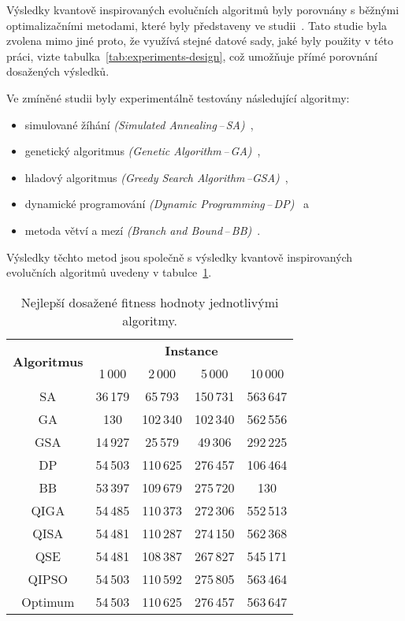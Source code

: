 Výsledky kvantově inspirovaných evolučních algoritmů byly porovnány s běžnými optimalizačními metodami, které byly představeny ve studii~\cite{compare}.  
Tato studie byla zvolena mimo jiné proto, že využívá stejné datové sady, jaké byly použity v této práci, vizte tabulka~\ref{tab:experiments-design}, což umožňuje přímé porovnání dosažených výsledků.

Ve zmíněné studii byly experimentálně testovány následující algoritmy:
\begin{itemize}
    \item simulované žíhání \emph{(Simulated Annealing\,--\,SA)}~\cite{sa},
    \item genetický algoritmus \emph{(Genetic Algorithm\,--\,GA)}~\cite{ga-app},
    \item hladový algoritmus \emph{(Greedy Search Algorithm\,--GSA)}~\cite{GSA},
    \item dynamické programování \emph{(Dynamic Programming\,--\,DP)}~\cite{DP} a 
    \item metoda větví a mezí \emph{(Branch and Bound\,--\,BB)}~\cite{BB}.
\end{itemize}
Výsledky těchto metod jsou společně s výsledky kvantově inspirovaných evolučních algoritmů uvedeny v tabulce~\ref{tab:alg-comparison}.

\begin{table}[ht]
    \centering
    \begin{tabular}{c c c c c}
        \toprule
        \multirow{2}{*}{\textbf{Algoritmus}} &
        \multicolumn{4}{c}{\textbf{Instance}} \\
        \cmidrule(lr){2-5}
              & 1\,000  & 2\,000   & 5\,000   & 10\,000 \\
        \midrule
        SA    & 36\,179 &  65\,793 & 150\,731 & 563\,647 \\[1ex]
        GA    &     130 & 102\,340 & 102\,340 & 562\,556 \\[1ex]
        GSA   & 14\,927 &  25\,579 &  49\,306 & 292\,225 \\[1ex]
        DP    & 54\,503 & 110\,625 & 276\,457 & 106\,464 \\[1ex]
        BB    & 53\,397 & 109\,679 & 275\,720 &      130 \\[1ex]
        QIGA  & 54\,485 & 110\,373 & 272\,306 & 552\,513 \\[1ex]
        QISA  & 54\,481 & 110\,287 & 274\,150 & 562\,368 \\[1ex]
        QSE   & 54\,481 & 108\,387 & 267\,827 & 545\,171 \\[1ex]
        QIPSO & 54\,503 & 110\,592 & 275\,805 & 563\,464 \\
        \midrule
        Optimum & 54\,503 & 110\,625 & 276\,457 & 563\,647 \\
        \bottomrule
    \end{tabular}
    \caption{Nejlepší dosažené fitness hodnoty jednotlivými algoritmy.}
    \label{tab:alg-comparison}
\end{table}

